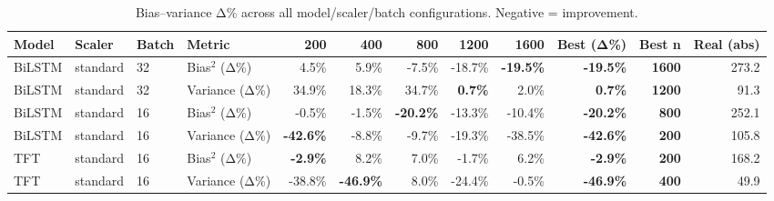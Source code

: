 \renewcommand{\arraystretch}{1.2}
\begin{table}[!t]
\centering
\footnotesize
\caption{Bias–variance Δ\% across all model/scaler/batch configurations. Negative = improvement.}
\label{tab:bvdelta_all}
\setlength{\tabcolsep}{4pt}
\begin{tabular}{l l l l rrrrrrrr}
\toprule
Model & Scaler & Batch & Metric & 200 & 400 & 800 & 1200 & 1600 & Best (Δ\%) & Best n & Real (abs) \\
\midrule
BiLSTM & standard & 32 & Bias$^2$ (Δ\%) & 4.5\% & 5.9\% & -7.5\% & -18.7\% & \textbf{-19.5\%} & \textbf{-19.5\%} & \textbf{1600} & 273.2 \\
BiLSTM & standard & 32 & Variance (Δ\%) & 34.9\% & 18.3\% & 34.7\% & \textbf{0.7\%} & 2.0\% & \textbf{0.7\%} & \textbf{1200} & 91.3 \\
BiLSTM & standard & 16 & Bias$^2$ (Δ\%) & -0.5\% & -1.5\% & \textbf{-20.2\%} & -13.3\% & -10.4\% & \textbf{-20.2\%} & \textbf{800} & 252.1 \\
BiLSTM & standard & 16 & Variance (Δ\%) & \textbf{-42.6\%} & -8.8\% & -9.7\% & -19.3\% & -38.5\% & \textbf{-42.6\%} & \textbf{200} & 105.8 \\
TFT & standard & 16 & Bias$^2$ (Δ\%) & \textbf{-2.9\%} & 8.2\% & 7.0\% & -1.7\% & 6.2\% & \textbf{-2.9\%} & \textbf{200} & 168.2 \\
TFT & standard & 16 & Variance (Δ\%) & -38.8\% & \textbf{-46.9\%} & 8.0\% & -24.4\% & -0.5\% & \textbf{-46.9\%} & \textbf{400} & 49.9 \\
\bottomrule
\end{tabular}

\end{table}
